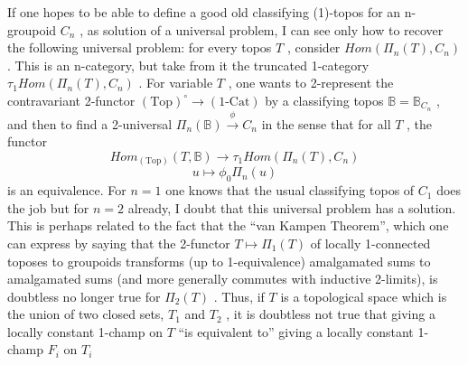 If one hopes to be able to define a good old classifying (1)-topos for
an n-groupoid $C_n$ , as solution of a universal problem, I can see only how
 to recover the following universal problem: for every topos $T$ , consider
$\mathit{Hom}(\Pi_n(T), C_n)$ . This is an n-category, but take from it the truncated
1-category $\tau_1 \mathit{Hom}(\Pi_n(T), C_n)$ . For variable $T$ , one wants to 2-represent
the contravariant 2-functor $(\mathrm{Top})^{\circ} \rightarrow (1\text{-}\mathrm{Cat})$ by a classifying topos
$\mathbb{B} = \mathbb{B}_{C_n}$ , and then to find a 2-universal $\Pi_n(\mathbb{B}) \xrightarrow{\ \phi\ } C_n$ in the sense that
for all $T$ , the functor
\[ \mathit{Hom}_{(\mathrm{Top})}(T, \mathbb{B}) \longrightarrow \tau_1 \mathit{Hom}(\Pi_n(T), C_n) \]
\[ u \longmapsto \phi_0 \Pi_n(u) \]
is an equivalence. For $n = 1$ one knows that the usual classifying topos
of $C_1$ does the job\unsure{,|\hand{,}} but for $n = 2$ already, I doubt that this universal
problem has a solution. This is perhaps related to the fact that the
``van Kampen Theorem'', which one can express by saying that the 2-functor
$T \longmapsto \Pi_1(T)$ of locally 1-connected toposes to groupoids transforms (up to
1-equivalence) amalgamated sums to amalgamated sums (and more generally commutes
with inductive 2-limits), is doubtless no longer true for $\Pi_2(T)$ . Thus,
if $T$ is a topological space which is the union of two closed sets, $T_1$ and
$T_2$ , it is doubtless not true that giving a locally constant 1-champ
on $T$ ``is equivalent to'' giving a locally constant 1-champ $F_i$ on $T_i$

